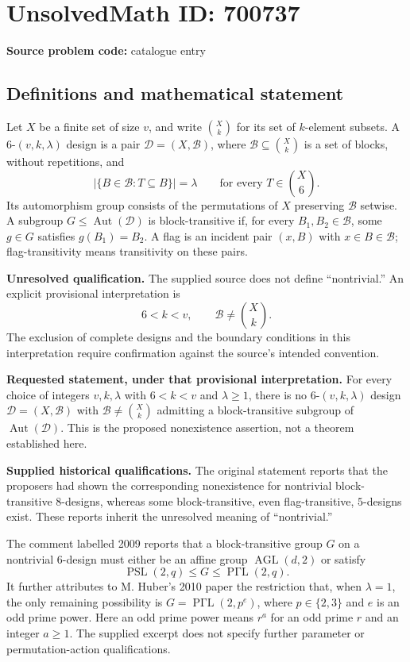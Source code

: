 \documentclass[11pt]{article}
\begin{document}
\section*{UnsolvedMath ID: 700737}
\textbf{Source problem code:} catalogue entry
\subsection{Definitions and mathematical statement}
Let \(X\) be a finite set of size \(v\), and write \(\binom{X}{k}\) for its set of \(k\)-element subsets. A \(6\)-\((v,k,\lambda)\) design is a pair \(\mathcal D=(X,\mathcal B)\), where \(\mathcal B\subseteq\binom{X}{k}\) is a set of blocks, without repetitions, and
\[
\left|\{B\in\mathcal B:T\subseteq B\}\right|=\lambda
\qquad\text{for every }T\in\binom{X}{6}.
\]
Its automorphism group consists of the permutations of \(X\) preserving \(\mathcal B\) setwise. A subgroup \(G\leq\operatorname{Aut}(\mathcal D)\) is block-transitive if, for every \(B_1,B_2\in\mathcal B\), some \(g\in G\) satisfies \(g(B_1)=B_2\). A flag is an incident pair \((x,B)\) with \(x\in B\in\mathcal B\); flag-transitivity means transitivity on these pairs.

\textbf{Unresolved qualification.} The supplied source does not define ``nontrivial.'' An explicit provisional interpretation is
\[
6<k<v,\qquad \mathcal B\neq\binom{X}{k}.
\]
The exclusion of complete designs and the boundary conditions in this interpretation require confirmation against the source's intended convention.

\textbf{Requested statement, under that provisional interpretation.} For every choice of integers \(v,k,\lambda\) with \(6<k<v\) and \(\lambda\geq1\), there is no \(6\)-\((v,k,\lambda)\) design \(\mathcal D=(X,\mathcal B)\) with \(\mathcal B\neq\binom{X}{k}\) admitting a block-transitive subgroup of \(\operatorname{Aut}(\mathcal D)\). This is the proposed nonexistence assertion, not a theorem established here.

\textbf{Supplied historical qualifications.} The original statement reports that the proposers had shown the corresponding nonexistence for nontrivial block-transitive \(8\)-designs, whereas some block-transitive, even flag-transitive, \(5\)-designs exist. These reports inherit the unresolved meaning of ``nontrivial.''

The comment labelled 2009 reports that a block-transitive group \(G\) on a nontrivial \(6\)-design must either be an affine group \(\operatorname{AGL}(d,2)\) or satisfy
\[
\operatorname{PSL}(2,q)\leq G\leq\operatorname{P\Gamma L}(2,q).
\]
It further attributes to M. Huber's 2010 paper the restriction that, when \(\lambda=1\), the only remaining possibility is \(G=\operatorname{P\Gamma L}(2,p^e)\), where \(p\in\{2,3\}\) and \(e\) is an odd prime power. Here an odd prime power means \(r^a\) for an odd prime \(r\) and an integer \(a\geq1\). The supplied excerpt does not specify further parameter or permutation-action qualifications.
\end{document}
